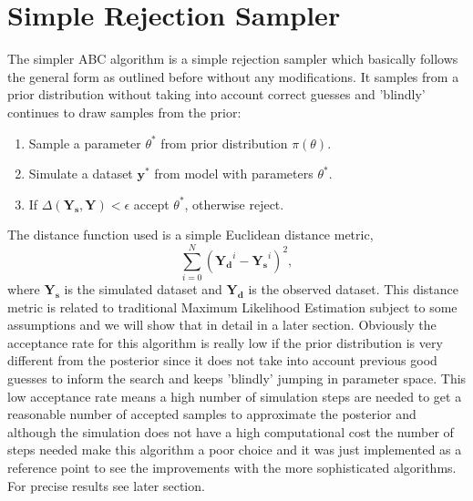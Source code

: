 \section{Simple Rejection Sampler}
\label{sec:rejection_sampler}
The simpler ABC algorithm is a simple rejection sampler\cite[] {pritchard1999population} which basically follows the general form as outlined before without any modifications. It samples from a prior distribution without taking into account correct guesses and 'blindly' continues to draw samples from the prior:
\begin{enumerate}[noitemsep]
\item{Sample a parameter $\theta ^*$ from prior distribution $\pi(\theta)$.}
\item{Simulate a dataset $\mathbf{y}^*$  from model with parameters $\theta ^*$.}
\item{If $\Delta(\mathbf{Y_{s}}, \mathbf{Y}) < \epsilon$ accept $\theta^*$, otherwise reject.}
\end{enumerate}
The distance function used is a simple Euclidean distance metric,
\begin{equation}
\sum_{i=0}^{N} (\mathbf{Y_{d}}^{i} -\mathbf{Y_{s}}^{i})^2,
\end{equation}
where $\mathbf{Y_{s}}$ is the simulated dataset and $\mathbf{Y_{d}}$ is the observed dataset. This distance metric is related to traditional Maximum Likelihood Estimation subject to some assumptions and we will show that in detail in a later section. Obviously the acceptance rate for this algorithm is really low if the prior distribution is very different from the posterior since it does not take into account previous good guesses to inform the search and keeps 'blindly' jumping in parameter space. This low acceptance rate means a high number of simulation steps are needed to get a reasonable number of accepted samples to approximate the posterior and although the simulation does not have a high computational cost the number of steps needed make this algorithm a poor choice and it was just implemented as a reference point to see the improvements with the more sophisticated algorithms. For precise results see later section.%
